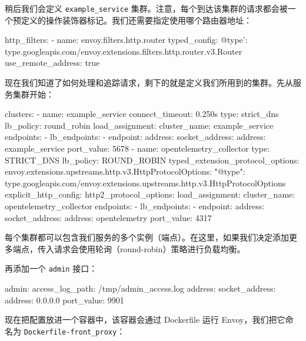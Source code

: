 稍后我们会定义 \texttt{example\_\allowbreak{}service} 集群。注意，每个到达该集群的请求都会被一个预定义的操作装饰器标记。我们还需要指定使用哪个路由器地址：

\begin{codebox}[python]
            http_filters:
            - name: envoy.filters.http.router
              typed_config:
                @type': type.googleapis.com/envoy.extensions.filters.http.router.v3.Router
            use_remote_address: true
\end{codebox}

\label{idx:412}
\label{idx:413}
现在我们知道了如何处理和追踪请求，剩下的就是定义我们所用到的集群。先从服务集群开始：

\begin{codebox}[yaml]
  clusters:
    - name: example_service
      connect_timeout: 0.250s
      type: strict_dns
      lb_policy: round_robin
      load_assignment:
        cluster_name: example_service
        endpoints:
          - lb_endpoints:
              - endpoint:
                  address:
                    socket_address:
                      address: example_service
                      port_value: 5678
    - name: opentelemetry_collector
      type: STRICT_DNS
      lb_policy: ROUND_ROBIN
      typed_extension_protocol_options:
        envoy.extensions.upstreams.http.v3.HttpProtocolOptions:
          "@type": type.googleapis.com/envoy.extensions.upstreams.http.v3.HttpProtocolOptions
          explicit_http_config:
            http2_protocol_options: {}
      load_assignment:
        cluster_name: opentelemetry_collector
        endpoints:
          - lb_endpoints:
              - endpoint:
                  address:
                    socket_address:
                      address: opentelemetry
                      port_value: 4317
\end{codebox}

\label{idx:414}
每个集群都可以包含我们服务的多个实例（端点）。在这里，如果我们决定添加更多端点，传入请求会使用轮询（round-robin）策略进行负载均衡。

再添加一个 \texttt{admin} 接口：

\begin{codebox}[yaml]
admin:
  access_log_path: /tmp/admin_access.log
  address:
    socket_address:
      address: 0.0.0.0
      port_value: 9901
\end{codebox}

现在把配置放进一个容器中，该容器会通过 Dockerfile 运行 Envoy，我们把它命名为 \texttt{Dockerfile-front\_\allowbreak{}proxy}：

